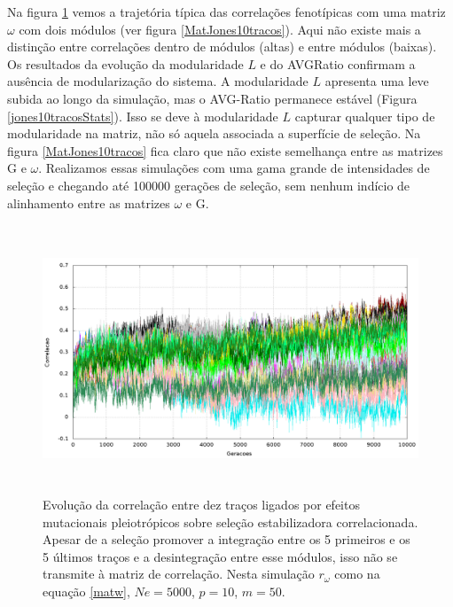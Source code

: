 Na figura \ref{jones10tracos} vemos a trajetória típica das correlações
fenotípicas com uma matriz $\omega$ com dois módulos (ver figura
\ref{MatJones10tracos}).  
Aqui não existe mais a distinção entre
correlações dentro de módulos (altas) e entre módulos (baixas). 
Os resultados da evolução da modularidade $L$ e do AVGRatio confirmam a
ausência de modularização do sistema. 
A modularidade $L$ apresenta uma leve subida ao longo da simulação, mas
o AVG-Ratio permanece estável (Figura \ref{jones10tracosStats}). 
Isso se deve à modularidade $L$ capturar qualquer tipo de modularidade
na matriz, não só aquela associada a superfície de seleção. 
Na figura \ref{MatJones10tracos} fica claro que não existe semelhança
entre as matrizes G e $\omega$. 
Realizamos essas simulações com uma gama grande de intensidades de
seleção e chegando até 100000 gerações de seleção, sem nenhum indício de
alinhamento entre as matrizes $\omega$ e G.  

\begin{center}
\begin{figure}[htbp]
  \includegraphics[width=150mm, height=80mm]{figuras/jones10tracos.png}
  \caption{Evolução da correlação entre dez traços ligados por efeitos
  mutacionais pleiotrópicos sobre seleção estabilizadora
  correlacionada. Apesar de a seleção promover a integração entre os
  5 primeiros e os 5 últimos traços e a desintegração entre esse
  módulos, isso não se transmite à matriz de correlação. Nesta simulação
  $r_\omega$ como na equação \ref{matw}, $Ne=5000$, $p=10$, $m=50$.}
  \label{jones10tracos}
\end{figure}
\end{center}

